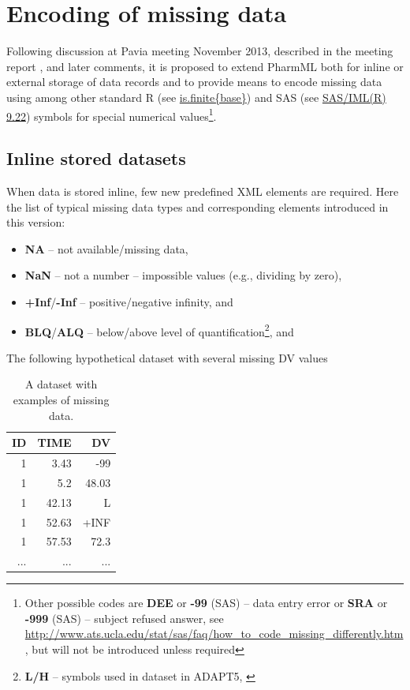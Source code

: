 \section{Encoding of missing data}
\label{sec:missingData}
Following discussion at Pavia meeting November 2013, described in the meeting 
report \cite{Swat:2013pavia}, and later comments, it is proposed to extend 
PharmML both for inline or external storage of data records and to provide means 
to encode missing data using among other standard R (see 
\href{https://stat.ethz.ch/R-manual/R-devel/library/base/html/is.finite.html}{is.finite\{base\}}) 
and SAS (see \href{http://support.sas.com/documentation/cdl/en/imlug/63541/HTML/default/viewer.htm#imlug_r_sect019.htm}{SAS/IML(R) 9.22}) symbols for special numerical 
values\footnote{Other possible codes are \textbf{DEE} or \textbf{-99} (SAS) -- data entry 
error or \textbf{SRA} or \textbf{-999} (SAS) -- subject refused answer, see \url{http://www.ats.ucla.edu/stat/sas/faq/how_to_code_missing_differently.htm}, but will not be 
introduced unless required}.

\subsection{Inline stored datasets}
When data is stored inline, few new predefined XML elements are required. Here the 
list of typical missing data types and corresponding elements introduced in this version:
\begin{itemize}
\item
\textbf{NA} -- not available/missing data, 
\item
\textbf{NaN} -- not a number -- impossible values (e.g., dividing by zero), 
\item
\textbf{+Inf}/\textbf{-Inf}  -- positive/negative infinity,  and 
\item
\textbf{BLQ}/\textbf{ALQ} -- below/above level of quantification\footnote{\textbf{L/H} -- symbols used in dataset in ADAPT5, \cite{DArgenio:2009aa}},  and 
\end{itemize}
The following hypothetical dataset with several missing DV values
\begin{table}[htdp]
\begin{center}
\small
\renewcommand{\arraystretch}{1.1}%
\begin{tabular}{rrr}
\hline
ID 	& TIME	& DV	 \\ 
\hline
1 	& 3.43 		& -99 	\\ 
1 	& 5.2 		& 48.03 	 \\ 
1 	& 42.13 		& L	 \\ 
1 	& 52.63 		& +INF 	 \\ 
1 	& 57.53 		& 72.3  \\ 
...	& ...		& ...	\\ 
\hline
\end{tabular}
\end{center}
\vspace{-1em}\caption{A dataset with examples of missing data.}
\label{tab:uslessDataSet}
\end{table}%

